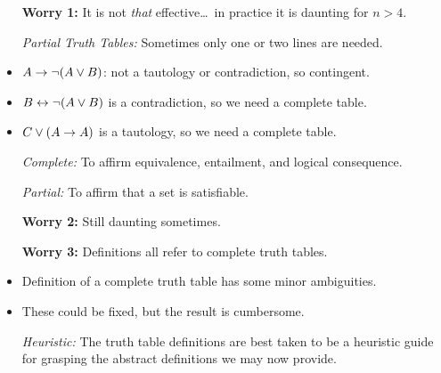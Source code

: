 \documentclass[a4paper, 11pt]{article} %
\begin{document}
\begin{itemize}[leftmargin=.75in,labelsep=.15in]
  \item[\bf Worry 1:] It is not \textit{that} effective\ldots\ in practice it is daunting for $n > 4$.
  \item[\it Partial Truth Tables:] Sometimes only one or two lines are needed.
    \item $A \rightarrow \neg (A \vee B)$: not a tautology or contradiction, so contingent. 
    \item $B \leftrightarrow \neg (A \vee B)$ is a contradiction, so we need a complete table. 
    \item $C \vee (A \rightarrow A)$ is a tautology, so we need a complete table. 
  \item[\it Complete:] To affirm equivalence, entailment, and logical consequence.
  \item[\it Partial:] To affirm that a set is satisfiable.
  \item[\bf Worry 2:] Still daunting sometimes.
  \item[\bf Worry 3:] Definitions all refer to complete truth tables.
    \item Definition of a complete truth table has some minor ambiguities.
    \item These could be fixed, but the result is cumbersome.
  \item[\it Heuristic:] The truth table definitions are best taken to be a heuristic guide for grasping the abstract definitions we may now provide.
\end{itemize}
\end{document}
